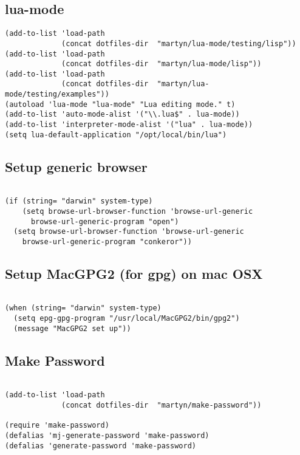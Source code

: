 \documentclass[colorlinks=true,urlcolor=blue,listings-sv]{article}
\begin{document}
\subsection{lua-mode}
\label{sec-1-43}



\lstset{language=Lisp}
\begin{lstlisting}
(add-to-list 'load-path
             (concat dotfiles-dir  "martyn/lua-mode/testing/lisp"))
(add-to-list 'load-path
             (concat dotfiles-dir  "martyn/lua-mode/lisp"))
(add-to-list 'load-path
             (concat dotfiles-dir  "martyn/lua-mode/testing/examples"))
(autoload 'lua-mode "lua-mode" "Lua editing mode." t)
(add-to-list 'auto-mode-alist '("\\.lua$" . lua-mode))
(add-to-list 'interpreter-mode-alist '("lua" . lua-mode))
(setq lua-default-application "/opt/local/bin/lua")
\end{lstlisting}
\subsection{Setup generic browser}
\label{sec-1-44}



\lstset{language=Lisp}
\begin{lstlisting}

(if (string= "darwin" system-type)
    (setq browse-url-browser-function 'browse-url-generic
      browse-url-generic-program "open")
  (setq browse-url-browser-function 'browse-url-generic
    browse-url-generic-program "conkeror"))
\end{lstlisting}
\subsection{Setup MacGPG2 (for gpg) on mac OSX}
\label{sec-1-45}



\lstset{language=Lisp}
\begin{lstlisting}

(when (string= "darwin" system-type)
  (setq epg-gpg-program "/usr/local/MacGPG2/bin/gpg2")
  (message "MacGPG2 set up"))
\end{lstlisting}
\subsection{Make Password}
\label{sec-1-46}



\lstset{language=Lisp}
\begin{lstlisting}

(add-to-list 'load-path
             (concat dotfiles-dir  "martyn/make-password"))

(require 'make-password)
(defalias 'mj-generate-password 'make-password)
(defalias 'generate-password 'make-password)
\end{lstlisting}
\end{document}
